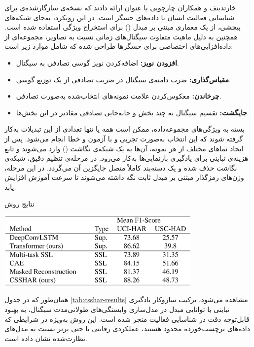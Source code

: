 خارتدینف و همکاران\cite{khaertdinov2021contrastive} چارچوبی با عنوان  ارائه دادند که نسخه‌ی سازگارشده‌ی  برای شناسایی فعالیت انسان با داده‌های حسگر است. در این رویکرد، به‌جای شبکه‌های پیچشی، از یک معماری مبتنی بر مبدل () برای استخراج ویژگی استفاده شده است. همچنین به دلیل ماهیت متفاوت سیگنال‌های زمانی نسبت به تصاویر، مجموعه‌ای از داده‌افزایی‌های اختصاصی برای حسگرها طراحی شده که شامل موارد زیر است:

\begin{itemize}
\item \textbf{افزودن نویز:} اضافه‌کردن نویز گوسی تصادفی به سیگنال.
\item \textbf{مقیاس‌گذاری:} ضرب دامنه‌ی سیگنال در ضریب تصادفی از یک توزیع گوسی.
\item \textbf{چرخاندن:} معکوس‌کردن علامت نمونه‌های انتخاب‌شده به‌صورت تصادفی.
\item \textbf{جایگشت:} تقسیم سیگنال به چند بخش و جابه‌جایی تصادفی مقادیر در این بخش‌ها.
\end{itemize}

بسته به ویژگی‌های مجموعه‌داده، ممکن است همه یا تنها تعدادی از این تبدیلات به‌کار گرفته شوند که این انتخاب به‌صورت تجربی و با آزمون و خطا انجام می‌شود. پس از ایجاد نماهای مختلف از هر نمونه، آن‌ها به یک شبکه‌ی نگاشت () وارد می‌شوند و تابع هزینه‌ی تباینی  برای یادگیری بازنمایی‌ها به‌کار می‌رود. در مرحله‌ی تنظیم دقیق، شبکه‌ی نگاشت حذف شده و یک دسته‌بند کاملاً متصل جایگزین آن می‌گردد. در این مرحله، وزن‌های رمزگذار مبتنی بر مبدل ثابت نگه داشته می‌شوند تا سرعت آموزش افزایش یابد.

\begin{table}[htbp]
\centering
\caption{نتایج روش }
\includegraphics[width=0.75\textwidth]{Images/Chapter2/csshar-results.png}
\label{tab:csshar-results}
\end{table}

همان‌طور که در جدول \ref{tab:csshar-results} مشاهده می‌شود، ترکیب سازوکار یادگیری تباینی  با توانایی مبدل در مدل‌سازی وابستگی‌های طولانی‌مدت سیگنال، به بهبود قابل‌توجه دقت در شناسایی فعالیت منجر شده است. این روش به‌ویژه در شرایطی که داده‌های برچسب‌خورده محدود هستند، عملکردی رقابتی یا حتی برتر نسبت به مدل‌های نظارت‌شده نشان داده است.

